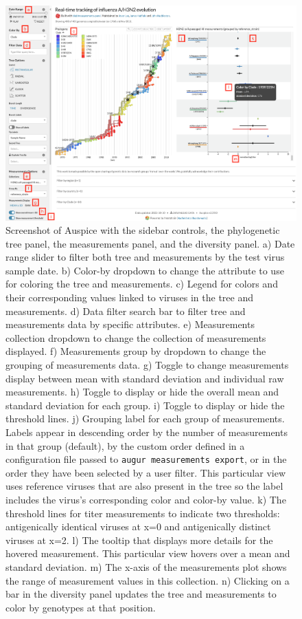 \documentclass[utf8]{FrontiersinHarvard} %
\begin{document}
\begin{figure}[h!]
  \begin{center}
    \includegraphics[width=\textwidth]{figures/figure-2-screen-shot}
  \end{center}
  \caption{
    Screenshot of Auspice with the sidebar controls, the phylogenetic tree panel, the measurements panel, and the diversity panel.
a) Date range slider to filter both tree and measurements by the test virus sample date.
b) Color-by dropdown to change the attribute to use for coloring the tree and measurements.
c) Legend for colors and their corresponding values linked to viruses in the tree and measurements.
d) Data filter search bar to filter tree and measurements data by specific attributes.
e) Measurements collection dropdown to change the collection of measurements displayed.
f) Measurements group by dropdown to change the grouping of measurements data.
g) Toggle to change measurements display between mean with standard deviation and individual raw measurements.
h) Toggle to display or hide the overall mean and standard deviation for each group.
i) Toggle to display or hide the threshold lines.
j) Grouping label for each group of measurements.
Labels appear in descending order by the number of measurements in that group (default), by the custom order defined in a configuration file passed to \texttt{augur measurements export}, or in the order they have been selected by a user filter.
This particular view uses reference viruses that are also present in the tree so the label includes the virus's corresponding color and color-by value.
k) The threshold lines for titer measurements to indicate two thresholds: antigenically identical viruses at x=0 and antigenically distinct viruses at x=2.
l) The tooltip that displays more details for the hovered measurement.
This particular view hovers over a mean and standard deviation.
m) The x-axis of the measurements plot shows the range of measurement values in this collection.
n) Clicking on a bar in the diversity panel updates the tree and measurements to color by genotypes at that position.
  }\label{fig:2}
\end{figure}
\end{document}
